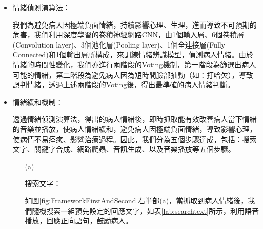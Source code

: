 \documentclass[12pt]{scrreprt}
\begin{document}
\begin{itemize}
\item{\begin{bfseries}{情緒偵測演算法：}\end{bfseries}}

我們為避免病人因極端負面情緒，持續影響心理、生理，進而導致不可預期的危害，我們利用深度學習的卷積神經網路CNN，由1個輸入層、6個卷積層(Convolution layer)、3個池化層(Pooling layer)、1個全連接層(Fully Connected)和1個輸出層所構成，來訓練情緒辨識模型，偵測病人情緒。由於情緒的時間性變化，我們亦進行兩階段的Voting機制，第一階段為篩選出病人可能的情緒，第二階段為避免病人因為短時間臉部抽動（如：打哈欠），導致誤判情緒，透過上述兩階段的Voting後，得出最準確的病人情緒判斷。\\

\item{\begin{bfseries}{情緒緩和機制：}\end{bfseries}}

透過情緒偵測演算法，得出的病人情緒後，即時抓取能有效改善病人當下情緒的音樂並播放，使病人情緒緩和，避免病人因極端負面情緒，導致影響心理，使病情不易痊癒、影響治療過程。因此，我們分為五個步驟達成，包括：搜索文字、關鍵字合成、網路爬蟲、音訊生成、以及音樂播放等五個步驟。
\begin{itemize}
\item[(a)]{\begin{bfseries}{搜索文字：}\end{bfseries}}

如圖\ref{fig:FrameworkFirstAndSecond}右半部(a)，當抓取到病人情緒後，我們隨機搜索一組預先設定的回應文字，如表\ref{lab:searchtext}所示，利用語音播放，回應正向語句，鼓勵病人。\\

\renewcommand{\arraystretch}{1.0} 
\renewcommand{\multirowsetup}{\centering}


\end{itemize}
\end{itemize}
\end{document}
